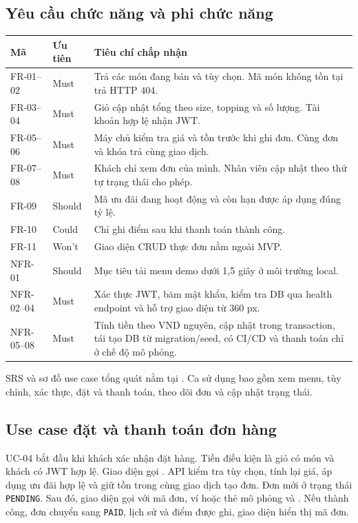 \documentclass[a4paper]{article}
\begin{document}
\subsection{Yêu cầu chức năng và phi chức năng}
\begin{tabularx}{\linewidth}{@{}l l X@{}}
\toprule
\textbf{Mã} & \textbf{Ưu tiên} & \textbf{Tiêu chí chấp nhận}\\
\midrule
FR-01--02 & Must & Trả các món đang bán và tùy chọn. Mã món không tồn tại trả HTTP 404.\\
FR-03--04 & Must & Giỏ cập nhật tổng theo size, topping và số lượng. Tài khoản hợp lệ nhận JWT.\\
FR-05--06 & Must & Máy chủ kiểm tra giá và tồn trước khi ghi đơn. Cùng đơn và khóa trả cùng giao dịch.\\
FR-07--08 & Must & Khách chỉ xem đơn của mình. Nhân viên cập nhật theo thứ tự trạng thái cho phép.\\
FR-09 & Should & Mã ưu đãi đang hoạt động và còn hạn được áp dụng đúng tỷ lệ.\\
FR-10 & Could & Chỉ ghi điểm sau khi thanh toán thành công.\\
FR-11 & Won't & Giao diện CRUD thực đơn nằm ngoài MVP.\\
NFR-01 & Should & Mục tiêu tải menu demo dưới 1,5 giây ở môi trường local.\\
NFR-02--04 & Must & Xác thực JWT, băm mật khẩu, kiểm tra DB qua health endpoint và hỗ trợ giao diện từ 360 px.\\
NFR-05--08 & Must & Tính tiền theo VND nguyên, cập nhật trong transaction, tái tạo DB từ migration/seed, có CI/CD và thanh toán chỉ ở chế độ mô phỏng.\\
\bottomrule
\end{tabularx}

SRS và sơ đồ use case tổng quát nằm tại . Ca sử dụng bao gồm xem menu, tùy chỉnh, xác thực, đặt và thanh toán, theo dõi đơn và cập nhật trạng thái.

\subsection{Use case đặt và thanh toán đơn hàng}
UC-04 bắt đầu khi khách xác nhận đặt hàng. Tiền điều kiện là giỏ có món và khách có JWT hợp lệ. Giao diện gọi . API kiểm tra tùy chọn, tính lại giá, áp dụng ưu đãi hợp lệ và giữ tồn trong cùng giao dịch tạo đơn. Đơn mới ở trạng thái \texttt{PENDING}. Sau đó, giao diện gọi  với mã đơn, ví hoặc thẻ mô phỏng và . Nếu thành công, đơn chuyển sang \texttt{PAID}, lịch sử và điểm được ghi, giao diện hiển thị mã đơn.
\end{document}
